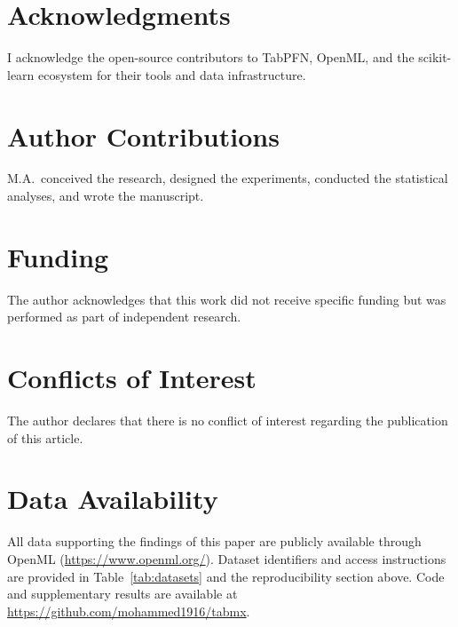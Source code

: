 \documentclass{article}
\begin{document}
\section*{Acknowledgments}

I acknowledge the open-source contributors to TabPFN, OpenML, and the scikit-learn ecosystem for their tools and data infrastructure.

\section*{Author Contributions}

M.A.\ conceived the research, designed the experiments, conducted the statistical analyses, and wrote the manuscript.

\section*{Funding}

The author acknowledges that this work did not receive specific funding but was performed as part of independent research.

\section*{Conflicts of Interest}

The author declares that there is no conflict of interest regarding the publication of this article.

\section*{Data Availability}

All data supporting the findings of this paper are publicly available through OpenML (\url{https://www.openml.org/}). Dataset identifiers and access instructions are provided in Table~\ref{tab:datasets} and the reproducibility section above. Code and supplementary results are available at \url{https://github.com/mohammed1916/tabmx}.

\printbibliography
\end{document}
